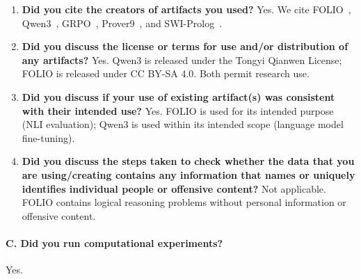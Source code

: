 \begin{enumerate}[label=B\arabic*.,leftmargin=*]
\item \textbf{Did you cite the creators of artifacts you used?}
Yes. We cite FOLIO~\citep{folio}, Qwen3~\citep{qwen3}, GRPO~\citep{deepseekmath}, Prover9~\citep{mccune-prover9}, and SWI-Prolog~\citep{wielemaker2012swi}.

\item \textbf{Did you discuss the license or terms for use and/or distribution of any artifacts?}
Yes. Qwen3 is released under the Tongyi Qianwen License; FOLIO is released under CC BY-SA 4.0. Both permit research use.

\item \textbf{Did you discuss if your use of existing artifact(s) was consistent with their intended use?}
Yes. FOLIO is used for its intended purpose (NLI evaluation); Qwen3 is used within its intended scope (language model fine-tuning).

\item \textbf{Did you discuss the steps taken to check whether the data that you are using/creating contains any information that names or uniquely identifies individual people or offensive content?}
Not applicable. FOLIO contains logical reasoning problems without personal information or offensive content.
\end{enumerate}

\paragraph{C. Did you run computational experiments?}
Yes.

